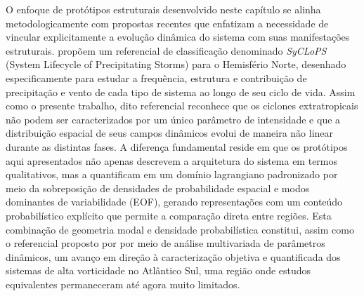 O enfoque de protótipos estruturais desenvolvido neste capítulo se alinha metodologicamente com propostas recentes que enfatizam a necessidade de vincular explicitamente a evolução dinâmica do sistema com suas manifestações estruturais. \citet{han2025system} propõem um referencial de classificação denominado \textit{SyCLoPS} (System Lifecycle of Precipitating Storms) para o Hemisfério Norte, desenhado especificamente para estudar a frequência, estrutura e contribuição de precipitação e vento de cada tipo de sistema ao longo de seu ciclo de vida. Assim como o presente trabalho, dito referencial reconhece que os ciclones extratropicais não podem ser caracterizados por um único parâmetro de intensidade e que a distribuição espacial de seus campos dinâmicos evolui de maneira não linear durante as distintas fases. A diferença fundamental reside em que os protótipos aqui apresentados não apenas descrevem a arquitetura do sistema em termos qualitativos, mas a quantificam em um domínio lagrangiano padronizado por meio da sobreposição de densidades de probabilidade espacial e modos dominantes de variabilidade (EOF), gerando representações com um conteúdo probabilístico explícito que permite a comparação direta entre regiões. Esta combinação de geometria modal e densidade probabilística constitui, assim como o referencial proposto por \citet{corner2025classification} por meio de análise multivariada de parâmetros dinâmicos, um avanço em direção à caracterização objetiva e quantificada dos sistemas de alta vorticidade no Atlântico Sul, uma região onde estudos equivalentes permaneceram até agora muito limitados.


